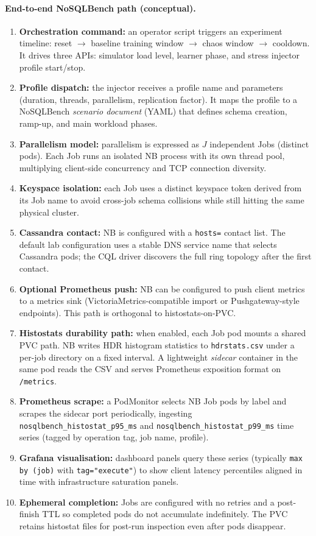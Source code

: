 \documentclass[11pt,a4paper]{article}
\begin{document}
\paragraph{End-to-end NoSQLBench path (conceptual).}
\begin{enumerate}[leftmargin=*]
  \item \textbf{Orchestration command:} an operator script triggers an experiment timeline: reset $\rightarrow$ baseline training window $\rightarrow$ chaos window $\rightarrow$ cooldown. It drives three APIs: simulator load level, learner phase, and stress injector profile start/stop.
  \item \textbf{Profile dispatch:} the injector receives a profile name and parameters (duration, threads, parallelism, replication factor). It maps the profile to a NoSQLBench \emph{scenario document} (YAML) that defines schema creation, ramp-up, and main workload phases.
  \item \textbf{Parallelism model:} parallelism is expressed as $J$ independent Jobs (distinct pods). Each Job runs an isolated NB process with its own thread pool, multiplying client-side concurrency and TCP connection diversity.
  \item \textbf{Keyspace isolation:} each Job uses a distinct keyspace token derived from its Job name to avoid cross-job schema collisions while still hitting the same physical cluster.
  \item \textbf{Cassandra contact:} NB is configured with a \texttt{hosts=} contact list. The default lab configuration uses a stable DNS service name that selects Cassandra pods; the CQL driver discovers the full ring topology after the first contact.
  \item \textbf{Optional Prometheus push:} NB can be configured to push client metrics to a metrics sink (VictoriaMetrics-compatible import or Pushgateway-style endpoints). This path is orthogonal to histostats-on-PVC.
  \item \textbf{Histostats durability path:} when enabled, each Job pod mounts a shared PVC path. NB writes HDR histogram statistics to \texttt{hdrstats.csv} under a per-job directory on a fixed interval. A lightweight \emph{sidecar} container in the same pod reads the CSV and serves Prometheus exposition format on \texttt{/metrics}.
  \item \textbf{Prometheus scrape:} a PodMonitor selects NB Job pods by label and scrapes the sidecar port periodically, ingesting \texttt{nosqlbench\_histostat\_p95\_ms} and \texttt{nosqlbench\_histostat\_p99\_ms} time series (tagged by operation tag, job name, profile).
  \item \textbf{Grafana visualisation:} dashboard panels query these series (typically \texttt{max by (job)} with \texttt{tag="execute"}) to show client latency percentiles aligned in time with infrastructure saturation panels.
  \item \textbf{Ephemeral completion:} Jobs are configured with no retries and a post-finish TTL so completed pods do not accumulate indefinitely. The PVC retains histostat files for post-run inspection even after pods disappear.
\end{enumerate}
\end{document}
